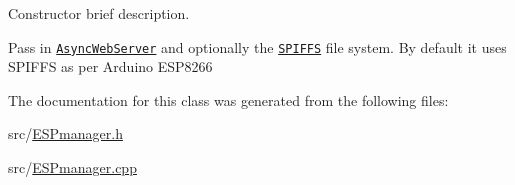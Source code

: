 Constructor brief description. 

Pass in \href{https://github.com/me-no-dev/ESPAsyncWebServer}{\tt Async\+Web\+Server} and optionally the \href{http://esp8266.github.io/Arduino/versions/2.3.0-rc2/doc/filesystem.html#file-system-object-spiffs}{\tt S\+P\+I\+F\+FS} file system. By default it uses S\+P\+I\+F\+FS as per Arduino E\+S\+P8266 

The documentation for this class was generated from the following files\+:\begin{DoxyCompactItemize}
\item 
src/\hyperlink{_e_s_pmanager_8h}{E\+S\+Pmanager.\+h}\item 
src/\hyperlink{_e_s_pmanager_8cpp}{E\+S\+Pmanager.\+cpp}\end{DoxyCompactItemize}
